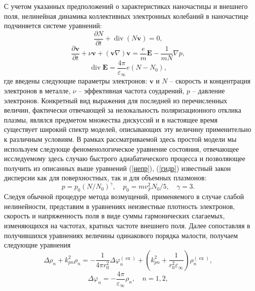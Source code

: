 \documentclass[12pt, a4paper]{article}
\renewcommand{\vec}{\mathbf}
\def \eps {\varepsilon}
\def \ph {\varphi}
\def \ex { \operatorname{ex}}
\newcommand{\dt}[1]{\frac{\partial {#1}}{\partial t}}
\begin{document}
С учетом указанных предположений о характеристиках наночастицы и внешнего поля, нелинейная динамика коллективных электронных колебаний в наночастице подчиняется системе уравнений:
\begin{equation} 
	\label{непр}
	\dt{N} + \operatorname{div}(N \vec{v}) = 0,
\end{equation}
\begin{equation} 
	\label{гидр}
	\dt{\vec{v}} + \nu \vec{v} +(\vec{v} \nabla)\vec{v} = \frac{e}{m}\vec{E} - \frac{1}{mN} \nabla p, 
\end{equation}
\begin{equation} 
	\label{максв}
	\operatorname{div}\vec{E} = \frac{4\pi}{\eps_\infty}e(N-N_0),
\end{equation}
где введены следующие параметры электронов: $\vec{v}$ и $N$ – скорость и концентрация электронов в металле, $\nu$ – эффективная частота соударений, 
$p$ – давление электронов. Конкретный вид выражения для последней из перечисленных величин, фактически отвечающей за нелокальность поляризационного отклика плазмы, являлся предметом множества дискуссий и в настоящее время существует широкий спектр моделей, описывающих эту величину применительно к различным условиям. В рамках рассматриваемой здесь простой модели мы используем следующе феноменологическое уравнение состояния, отвечающее исследуемому здесь случаю быстрого адиабатического процесса и позволяющее получить из описанных выше уравнений (\ref{непр}), (\ref{гидр}) известный закон дисперсии как для поверхностных, так и для объемных плазмонов: 
\begin{equation}
	\label{p}
 p = p_0 (N/N_0)^\gamma, \quad p_0 = m v_F^2 N_0/5, \quad \gamma = 3.
\end{equation}
Следуя обычной процедуре метода возмущений, применяемого в случае слабой нелинейности, представим в уравнениях неизвестные плотность электронов, скорость и напряженность поля в виде суммы гармонических слагаемых, изменяющихся на частотах, кратных частоте внешнего поля. Далее сопоставляя в получившихся уравнениях величины одинакового порядка малости, получаем следующие уравнения
\begin{equation} 
	\label{rho_sys}
 \Delta \rho_{n} + k_{pn}^2\rho_{n} = -\frac{1}{4 \pi r_0^2} \Delta \ph^{(\ex)}_{n} + \left( k_{pn}^2 + \frac{1}{r_0^2\eps_\infty}\right) {\rho^{(\ex)}_{n},}
\end{equation}
\begin{equation} 
	\label{phi_sys}
 \Delta \ph_{n} = - \frac{4 \pi}{\eps_\infty} \rho_{n}, \quad n = 1,2,
\end{equation}
\end{document}
